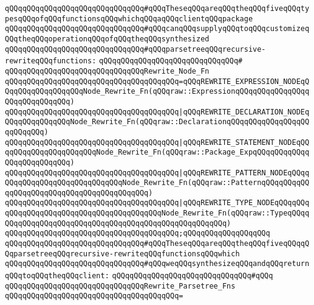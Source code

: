 \newline
\verb|qQQqqQQqqQQqqQQqqQQqqQQqqQQqqQQq#qQQqTheseqQQqareqQQqtheqQQqfiveqQQqtypesqQQqofqQQqfunctionsqQQqwhichqQQqaqQQqclientqQQqpackage|\newline
\verb|qQQqqQQqqQQqqQQqqQQqqQQqqQQqqQQq#qQQqcanqQQqsupplyqQQqtoqQQqcustomizeqQQqtheqQQqoperationqQQqofqQQqtheqQQqsynthesized|\newline
\verb|qQQqqQQqqQQqqQQqqQQqqQQqqQQqqQQq#qQQqparsetreeqQQqrecursive-rewriteqQQqfunctions:|\newline
\verb|qQQqqQQqqQQqqQQqqQQqqQQqqQQqqQQq#|\newline
\verb|qQQqqQQqqQQqqQQqqQQqqQQqqQQqqQQqRewrite_Node_Fn|\newline
\verb|qQQqqQQqqQQqqQQqqQQqqQQqqQQqqQQqqQQqqQQq=qQQqREWRITE_EXPRESSION_NODEqQQqqQQqqQQqqQQqqQQqNode_Rewrite_Fn(qQQqraw::ExpressionqQQqqQQqqQQqqQQqqQQqqQQqqQQqqQQq)|\newline
\verb|qQQqqQQqqQQqqQQqqQQqqQQqqQQqqQQqqQQqqQQq|\verb#|qQQqREWRITE_DECLARATION_NODEqQQqqQQqqQQqqQQqNode_Rewrite_Fn(qQQqraw::DeclarationqQQqqQQqqQQqqQQqqQQqqQQqqQQq)#\newline
\verb|qQQqqQQqqQQqqQQqqQQqqQQqqQQqqQQqqQQqqQQq|\verb#|qQQqREWRITE_STATEMENT_NODEqQQqqQQqqQQqqQQqqQQqqQQqNode_Rewrite_Fn(qQQqraw::Package_ExpqQQqqQQqqQQqqQQqqQQqqQQqqQQq)#\newline
\verb|qQQqqQQqqQQqqQQqqQQqqQQqqQQqqQQqqQQqqQQq|\verb#|qQQqREWRITE_PATTERN_NODEqQQqqQQqqQQqqQQqqQQqqQQqqQQqqQQqNode_Rewrite_Fn(qQQqraw::PatternqQQqqQQqqQQqqQQqqQQqqQQqqQQqqQQqqQQqqQQqqQQq)#\newline
\verb|qQQqqQQqqQQqqQQqqQQqqQQqqQQqqQQqqQQqqQQq|\verb#|qQQqREWRITE_TYPE_NODEqQQqqQQqqQQqqQQqqQQqqQQqqQQqqQQqqQQqqQQqqQQqNode_Rewrite_Fn(qQQqraw::TypeqQQqqQQqqQQqqQQqqQQqqQQqqQQqqQQqqQQqqQQqqQQqqQQqqQQqqQQq)#\newline
\verb|qQQqqQQqqQQqqQQqqQQqqQQqqQQqqQQqqQQqqQQq;qQQqqQQqqQQqqQQqqQQq|\newline
\newline
\verb|qQQqqQQqqQQqqQQqqQQqqQQqqQQqqQQq#qQQqTheseqQQqareqQQqtheqQQqfiveqQQqqQQqparsetreeqQQqrecursive-rewriteqQQqfunctionsqQQqwhich|\newline
\verb|qQQqqQQqqQQqqQQqqQQqqQQqqQQqqQQq#qQQqweqQQqsynthesizeqQQqandqQQqreturnqQQqtoqQQqtheqQQqclient:|\newline
\verb|qQQqqQQqqQQqqQQqqQQqqQQqqQQqqQQq#qQQq|\newline
\verb|qQQqqQQqqQQqqQQqqQQqqQQqqQQqqQQqRewrite_Parsetree_Fns|\newline
\verb|qQQqqQQqqQQqqQQqqQQqqQQqqQQqqQQqqQQqqQQq=|\newline
